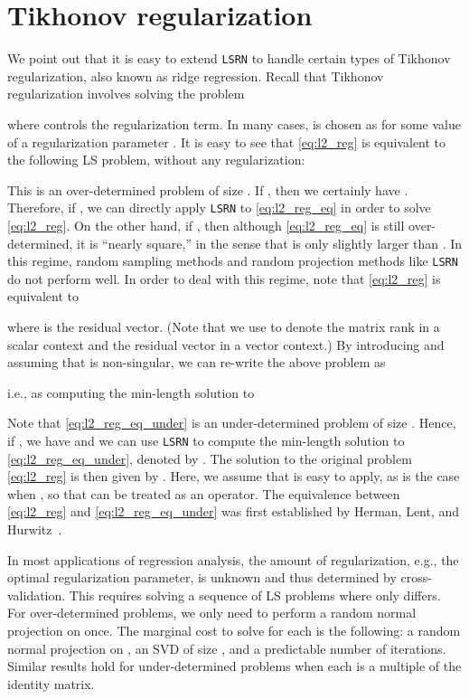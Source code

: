 \documentclass{siamltex}
\begin{document}
\section{Tikhonov regularization}
\label{sec:regularization}

We point out that it is easy to extend \texttt{LSRN} to handle certain types of
Tikhonov regularization, also known as ridge regression.  Recall that Tikhonov
regularization involves solving the problem

where  controls the regularization term.  In many
cases,  is chosen as  for some value of a regularization
parameter .  It is easy to see that \eqref{eq:l2_reg} is equivalent
to the following LS problem, without any regularization:

This is an over-determined problem of size .  If , then
we certainly have .  Therefore, if , we can directly apply
\texttt{LSRN} to \eqref{eq:l2_reg_eq} in order to solve \eqref{eq:l2_reg}.  On
the other hand, if , then although \eqref{eq:l2_reg_eq} is still
over-determined, it is ``nearly square,'' in the sense that  is only
slightly larger than .  In this regime, random sampling methods and random
projection methods like \texttt{LSRN} do not perform well. In order to deal with
this regime, note that \eqref{eq:l2_reg} is equivalent to

where  is the residual vector.  (Note that we use  to denote the
matrix rank in a scalar context and the residual vector in a vector context.)
By introducing  and assuming that  is non-singular, we can re-write
the above problem as

i.e., as computing the min-length solution to

Note that \eqref{eq:l2_reg_eq_under} is an under-determined problem of size . Hence, if , we have  and we can use
\texttt{LSRN} to compute the min-length solution to \eqref{eq:l2_reg_eq_under},
denoted by {\scriptsize }.  The solution to the
original problem \eqref{eq:l2_reg} is then given by .  Here,
we assume that  is easy to apply, as is the case when ,
so that  can be treated as an operator.
The equivalence between \eqref{eq:l2_reg} and \eqref{eq:l2_reg_eq_under} was 
first established by Herman, Lent, and Hurwitz~\cite{herman1980storage}. 


In most applications of regression analysis, the amount of regularization, e.g.,
the optimal regularization parameter, is unknown and thus determined by
cross-validation.  This requires solving a sequence of LS problems where only
 differs.  For over-determined problems, we only need to perform a random
normal projection on  once.  The marginal cost to solve for each  is the
following: a random normal projection on , an SVD of size , and a predictable number of iterations.  Similar results hold
for under-determined problems when each  is a multiple of the identity
matrix.
\end{document}
